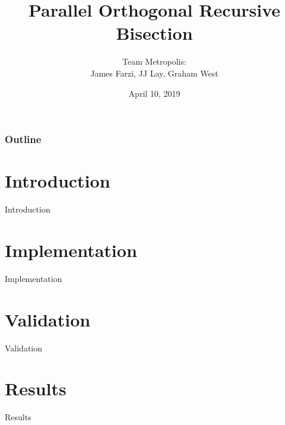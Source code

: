 \documentclass{beamer}
\title[Capstone]{Parallel Orthogonal Recursive Bisection}
\author{Team Metropolis:\\
James Farzi, JJ Lay, Graham West}
\date{April 10, 2019}
\begin{document}
\frame{\titlepage}

\begin{frame}	
	\frametitle{Outline}
	\tableofcontents	
\end{frame}


\section{Introduction}

\begin{frame}	
	\begin{Huge}
		\begin{center}
			Introduction
		\end{center}
	\end{Huge}
\end{frame}


\section{Implementation}

\begin{frame}	
	\begin{Huge}
		\begin{center}
			Implementation
		\end{center}
	\end{Huge}
\end{frame}


\section{Validation}

\begin{frame}	
	\begin{Huge}
		\begin{center}
			Validation
		\end{center}
	\end{Huge}
\end{frame}


\section{Results}

\begin{frame}	
	\begin{Huge}
		\begin{center}
			Results
		\end{center}
	\end{Huge}
\end{frame}
\end{document}
